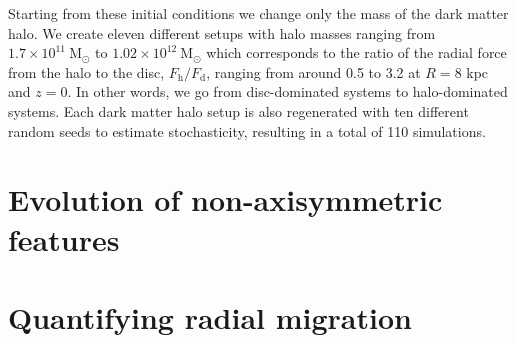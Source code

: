 Starting from these initial conditions we change only the mass of the dark matter halo. We create eleven different setups with halo masses ranging from $1.7\times 10^11\ \mathrm{M}_\odot$ to $1.02\times 10^12\ \mathrm{M}_\odot$ which corresponds to the ratio of the radial force from the halo to the disc, $F_\mathrm{h}/F_\mathrm{d}$, ranging from around 0.5 to 3.2 at $R = 8$ kpc and $z = 0$. In other words, we go from disc-dominated systems to halo-dominated systems. Each dark matter halo setup is also regenerated with ten different random seeds to estimate stochasticity, resulting in a total of 110 simulations.

\section{Evolution of non-axisymmetric features}\label{sec:p1-evolution}

\section{Quantifying radial migration}\label{sec:p1-quantifying}